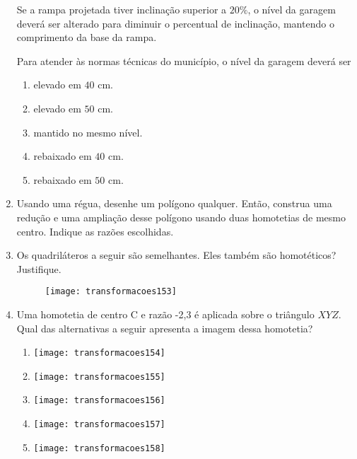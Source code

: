 \begin{enumerate}
Se a rampa projetada tiver inclinação superior a $20\%$, o nível da garagem deverá ser alterado para diminuir o percentual de inclinação, mantendo o comprimento da base da rampa.

Para atender às normas técnicas do município, o nível da garagem deverá ser 
\begin{enumerate}
\item elevado em $40$ cm.
\item elevado em $50$ cm.
\item mantido no mesmo nível.
\item rebaixado em $40$ cm.
\item rebaixado em $50$ cm.
\end{enumerate}


\item Usando uma régua, desenhe um polígono qualquer. Então, construa uma redução e uma ampliação desse polígono usando duas homotetias de mesmo centro. Indique as razões escolhidas. 

\item  Os quadriláteros a seguir são semelhantes. Eles também são homotéticos? Justifique.
\begin{figure}[H]
\centering

\texttt{[image: transformacoes153]}
\end{figure}


\item Uma homotetia de centro C e razão -2,3 é aplicada sobre o triângulo $XYZ$. Qual das alternativas a seguir apresenta a imagem dessa homotetia?

\begin{multicols}{2}
\begin{enumerate}
\item {}
{
\texttt{[image: transformacoes154]}
}
\item {}
{
\texttt{[image: transformacoes155]}
}
\item {}
{
\texttt{[image: transformacoes156]}
}
\item {}
{
\texttt{[image: transformacoes157]}
}
\item {}
{
\texttt{[image: transformacoes158]}
}
\end{enumerate}
\end{multicols}
\end{enumerate}

